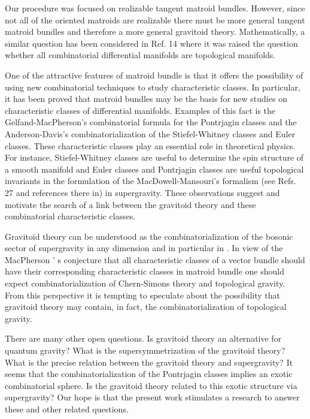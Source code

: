 \documentclass[a4paper,12pt]{article}
\begin{document}
Our procedure was focused on realizable tangent matroid bundles. However,
since not all of the oriented matroids are realizable there must be more
general tangent matroid bundles and therefore a more general gravitoid
theory. Mathematically, a similar question has been considered in Ref. 14
where it was raised the question whether all combinatorial differential
manifolds are topological manifolds.

One of the attractive features of matroid bundle is that it offers the
possibility of using new combinatorial techniques to study characteristic
classes. In particular, it has been proved that matroid bundles may be the
basis for new studies on characteristic classes of differential manifolds.
Examples of this fact is the Gelfand-MacPherson's combinatorial formula\coordHE{} for the Pontrjagin classes and the Anderson-Davis's
combinatorialization\coordHE{} of the Stiefel-Whitney classes and Euler
classes. These characteristic classes play an essential role in theoretical
physics. For instance, Stiefel-Whitney classes are useful to determine the
spin structure of a smooth manifold and Euler classes and Pontrjagin classes
are useful topological invariants in the formulation of the
MacDowell-Mansouri's formalism (see Refs. 27 and references there in) in
supergravity. These observations suggest and motivate the search of a link
between the gravitoid theory and these combinatorial characteristic classes.

Gravitoid theory can be understood as the combinatorialization of the
bosonic sector of supergravity in any dimension and in particular in \coordHE{}.
In view of the MacPherson%
\'{}%
s conjecture that all characteristic classes of a vector bundle should have
their corresponding characteristic classes in matroid bundle one should
expect combinatorialization of Chern-Simons theory and topological gravity\coordHE{}. From this perspective it is tempting to speculate about the
possibility that gravitoid theory may contain, in fact, the
combinatorialization of topological gravity.

There are many other open questions. Is gravitoid theory an alternative for
quantum gravity? What is the supersymmetrization of the gravitoid theory?
What is the precise relation between the gravitoid theory and \coordHE{}
supergravity? It seems that the combinatorialization of the Pontrjagin
classes implies an exotic combinatorial \coordHE{} sphere. Is the gravitoid theory
related to this exotic structure via \coordHE{} supergravity? Our hope is that
the present work stimulates a research to answer these and other related
questions.
\end{document}
